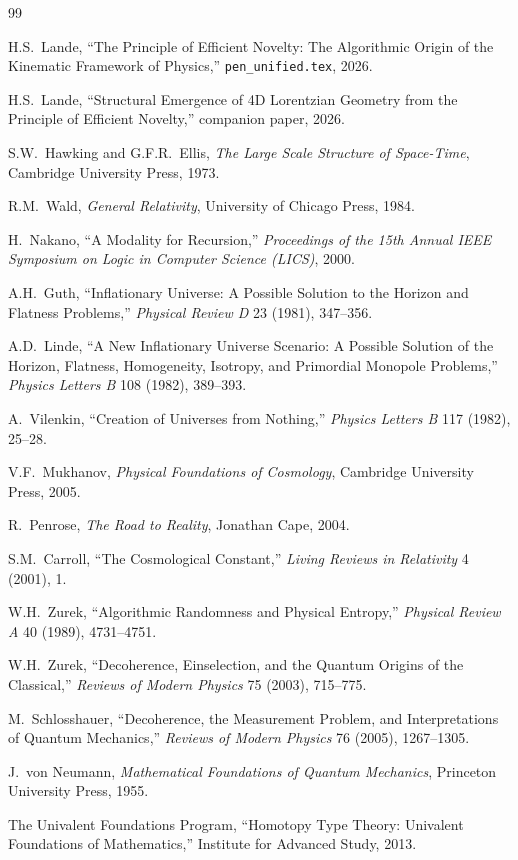 \documentclass[11pt,a4paper]{article}
\theoremstyle{plain}
\theoremstyle{definition}
\theoremstyle{remark}
\begin{document}
\begin{thebibliography}{99}

H.S.\ Lande, ``The Principle of Efficient Novelty: The Algorithmic Origin of the Kinematic Framework of Physics,'' \texttt{pen\_unified.tex}, 2026.

H.S.\ Lande, ``Structural Emergence of 4D Lorentzian Geometry from the Principle of Efficient Novelty,'' companion paper, 2026.

S.W.\ Hawking and G.F.R.\ Ellis, \emph{The Large Scale Structure of Space-Time}, Cambridge University Press, 1973.

R.M.\ Wald, \emph{General Relativity}, University of Chicago Press, 1984.

H.\ Nakano, ``A Modality for Recursion,'' \emph{Proceedings of the 15th Annual IEEE Symposium on Logic in Computer Science (LICS)}, 2000.

A.H.\ Guth, ``Inflationary Universe: A Possible Solution to the Horizon and Flatness Problems,'' \emph{Physical Review D} 23 (1981), 347--356.

A.D.\ Linde, ``A New Inflationary Universe Scenario: A Possible Solution of the Horizon, Flatness, Homogeneity, Isotropy, and Primordial Monopole Problems,'' \emph{Physics Letters B} 108 (1982), 389--393.

A.\ Vilenkin, ``Creation of Universes from Nothing,'' \emph{Physics Letters B} 117 (1982), 25--28.

V.F.\ Mukhanov, \emph{Physical Foundations of Cosmology}, Cambridge University Press, 2005.

R.\ Penrose, \emph{The Road to Reality}, Jonathan Cape, 2004.

S.M.\ Carroll, ``The Cosmological Constant,'' \emph{Living Reviews in Relativity} 4 (2001), 1.

W.H.\ Zurek, ``Algorithmic Randomness and Physical Entropy,'' \emph{Physical Review A} 40 (1989), 4731--4751.

W.H.\ Zurek, ``Decoherence, Einselection, and the Quantum Origins of the Classical,'' \emph{Reviews of Modern Physics} 75 (2003), 715--775.

M.\ Schlosshauer, ``Decoherence, the Measurement Problem, and Interpretations of Quantum Mechanics,'' \emph{Reviews of Modern Physics} 76 (2005), 1267--1305.

J.\ von Neumann, \emph{Mathematical Foundations of Quantum Mechanics}, Princeton University Press, 1955.

The Univalent Foundations Program, ``Homotopy Type Theory: Univalent Foundations of Mathematics,'' Institute for Advanced Study, 2013.

\end{thebibliography}
\end{document}
